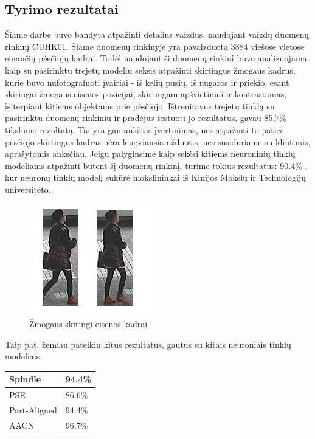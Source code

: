 \documentclass{VUMIFPSkursinis}
\begin{document}
\subsection{Tyrimo rezultatai}
Šiame darbe buvo bandyta atpažinti detalius vaizdus, naudojant vaizdų duomenų rinkinį CUHK01. Šiame duomenų rinkinyje yra pavaizduota 3884 viešose vietose einančių pėsčiųjų kadrai. Todėl naudojant ši duomenų rinkinį buvo analizuojama, kaip su pasirinktu trejetų modeliu seksis atpažinti skirtingus žmogaus kadrus, kurie buvo nufotografuoti įvairiai -  iš kelių pusių, iš nugaros ir priekio, esant skiringai žmogaus eisenos pozicijai, skirtingam apšvietimui ir kontrastamas, įsiterpiant kitiems objektams prie pėsčiojo.
\newline
Ištreniravus trejetų tinklą su pasirinktu duomenų rinkiniu ir pradėjus testuoti jo rezultatus, gavau 85,7\% tikslumo rezultatą. Tai yra gan aukštas įvertinimas, nes atpažinti to paties pėsčiojo skirtingus kadras nėra lengviausia užduotis, nes susiduriame su kliūtimis, aprašytomis anksčiau. Jeigu palyginsime kaip sekėsi kitiems neuroninių tinklų modeliams atpažinti būtent šį duomenų rinkinį, turime tokius rezultatus:
90.4\% , kur neuronų tinklų modelį sukūrė mokslininkai iš Kinijos Mokslų ir Technologijų universiteto. \cite{Person_reindentification}
\begin{figure}[H]
\centering
\includegraphics[scale=1.0]{img/Frame_diff.png}
\caption{Žmogaus skiringi eisenos kadrai} %
\label{img:mlp}
\end{figure}
Taip pat, žemiau pateikiu kitus rezultatus, gautus su kitais neuroniais tinklų modeliais:

\begin{center}
\begin{tabular}{ | m{5em} | m{5em}| } 
\hline
Spindle & 94.4\% \\
\hline
PSE & 86.6\% \\
\hline
Part-Aligned& 94.4\% \\
\hline
AACN & 96.7\% \\
\hline
\end{tabular}
\end{center}
\end{document}
